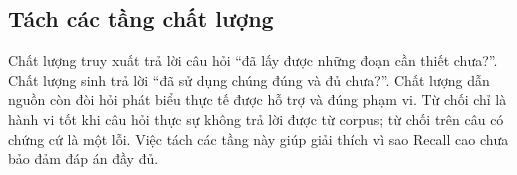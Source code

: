 \subsection{Tách các tầng chất lượng}
Chất lượng truy xuất trả lời câu hỏi ``đã lấy được những đoạn cần thiết chưa?''. Chất lượng sinh trả lời ``đã sử dụng chúng đúng và đủ chưa?''. Chất lượng dẫn nguồn còn đòi hỏi phát biểu thực tế được hỗ trợ và đúng phạm vi. Từ chối chỉ là hành vi tốt khi câu hỏi thực sự không trả lời được từ corpus; từ chối trên câu có chứng cứ là một lỗi. Việc tách các tầng này giúp giải thích vì sao Recall cao chưa bảo đảm đáp án đầy đủ.
